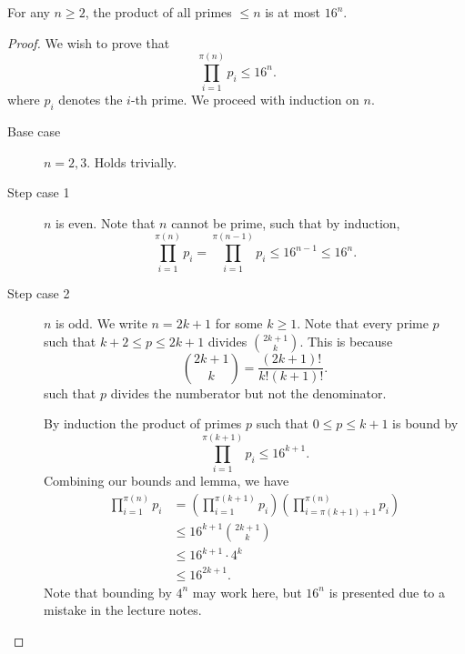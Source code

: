 \begin{lemma}
	For any \( n\ge 2 \), the product of all primes \( \le n \) is at most \( 16^{n}  \).
\end{lemma}
\begin{proof}
	We wish to prove that \[
		\prod_{i=1}^{\pi (n)}p_i \le 16^{n}  
	.\] where \( p_i \) denotes the \( i \)-th prime. We proceed with induction on \( n \).
	\begin{description}
		\item[Base case] \( n=2,3 \). Holds trivially.
		\item[Step case 1] \( n \) is even. Note that \( n \) cannot be prime, such that by induction, \[
			\prod_{i=1}^{\pi (n)} p_i =  \prod_{i=1}^{\pi (n-1)} p_i \le  16^{n-1} \le 16^{n} 
		.\] 
		\item[Step case 2] \( n \) is odd. We write \( n=2k+1 \) for some \( k \ge 1 \). Note that every prime \( p \) such that \( k+2 \le p \le 2k + 1 \) divides \( \binom{2k+1}{k} \). This is because \[
				\binom{2k+1}{k} = \frac{(2k+1)!}{k!(k+1)!}
		.\] such that \( p \) divides the numberator but not the denominator. 

		By induction the product of primes \( p \) such that \( 0 \le p \le k+1 \) is bound by \[
			\prod_{i=1}^{\pi (k+1)}p_i \le 16^{k+1}  
		.\] Combining our bounds and lemma, we have
		\begin{align*}
			\prod_{i=1}^{\pi (n)} p_i &= \left(\prod_{i=1}^{\pi (k+1)} p_i \right)\left( \prod_{i=\pi (k+1)+1}^{\pi (n)}p_i  \right) \\
													&\le 16^{k+1} \binom{2k+1}{k} \\
													&\le 16^{k+1} \cdot 4^{k}  \\
													&\le 16^{2k+1} 
		.\end{align*}
		Note that bounding by \( 4^{n}  \) may work here, but \( 16^{n}  \) is presented due to a mistake in the lecture notes.
	\end{description}
\end{proof}

